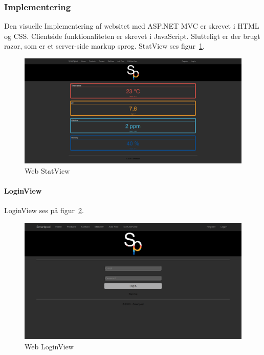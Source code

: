 \subsubsection{Implementering}
Den visuelle Implementering af websitet med ASP.NET MVC er skrevet i HTML og CSS. Clientside funktionaliteten er skrevet i JavaScript. Slutteligt er der brugt razor, som er et server-side markup sprog. StatView ses figur~\ref{fig:webstatview}.

\begin{figure}
	\centering
	\includegraphics[width=0.9\linewidth]{figs/implementering/web_statview}
	\caption{Web StatView}
	\label{fig:webstatview}
\end{figure}

\paragraph{LoginView}

LoginView ses på figur~\ref{fig:webloginview}.

\begin{figure}
	\centering
	\includegraphics[width=0.9\linewidth]{figs/implementering/web_login}
	\caption{Web LoginView}
	\label{fig:webloginview}
\end{figure}


